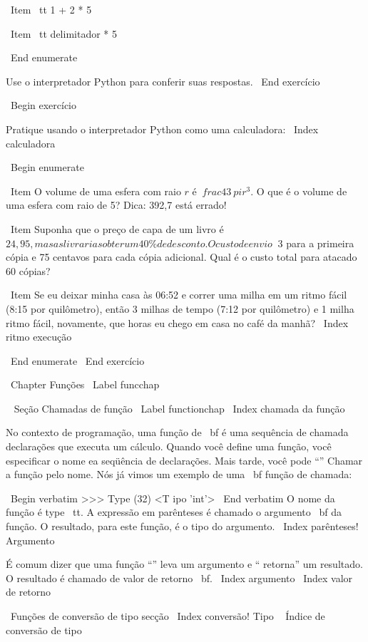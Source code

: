 \documentclass[10pt]{book}
\begin{document}
{\ Item {\ tt 1 + 2 * 5}

\ Item {\ tt delimitador * 5}

\ End {enumerate}

Use o interpretador Python para conferir suas respostas.
\ End {} exercício

\ Begin {} exercício

Pratique usando o interpretador Python como uma calculadora: 
\ Index {calculadora}

\ Begin {enumerate}

\ Item O volume de uma esfera com raio $ r $ é $ \ frac {4} {3} \ pi r ^ 3 $.
  O que é o volume de uma esfera com raio de 5? Dica: 392,7 está errado!

\ Item Suponha que o preço de capa de um livro é \ $ 24,95, mas as livrarias obter um
  40 \% de desconto. O custo de envio \ $ 3 para a primeira cópia e 75 centavos
  para cada cópia adicional. Qual é o custo total para atacado
  60 cópias?

\ Item Se eu deixar minha casa às 06:52 e correr uma milha em um ritmo fácil
  (8:15 por quilômetro), então 3 milhas de tempo (7:12 por quilômetro) e 1 milha
  ritmo fácil, novamente, que horas eu chego em casa no café da manhã?
\ Index {ritmo execução}

\ End {enumerate}
\ End {} exercício


\ Chapter {Funções}
\ Label {} funcchap

\ {} Seção Chamadas de função
\ Label {} functionchap
\ Index {chamada da função}

No contexto de programação, uma função de {\ bf} é uma sequência de chamada
declarações que executa um cálculo. Quando você define uma função,
você especificar o nome ea seqüência de declarações. Mais tarde, você pode
``'' Chamar a função pelo nome.  
Nós já vimos um exemplo de uma {\ bf função de chamada}:

\ Begin {verbatim}
>>> Type (32)
<T ipo 'int'>
\ End {verbatim}
%
O nome da função é {type \ tt}. A expressão em parênteses
é chamado o argumento {\ bf} da função. O resultado, para este
função, é o tipo do argumento.
\ Index {parênteses! Argumento}

É comum dizer que uma função ``'' leva um argumento e `` retorna''
um resultado. O resultado é chamado de valor de retorno {\ bf}.
\ Index {argumento}
\ Index {valor de retorno}


\ {Funções de conversão de tipo} secção
\ Index {conversão! Tipo}
\ {} Índice de conversão de tipo

}
\end{document}
